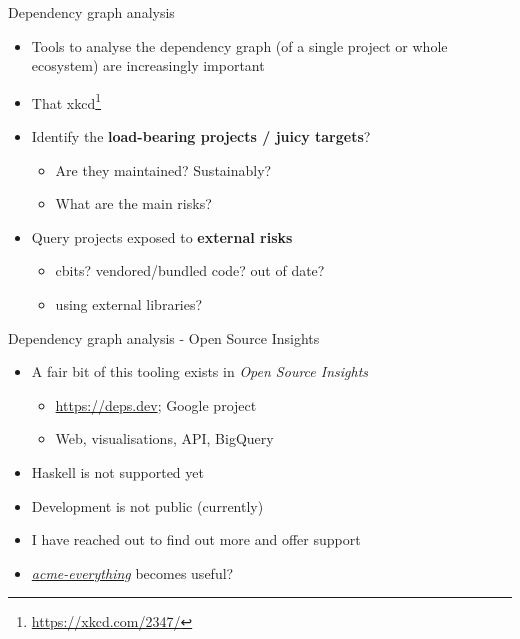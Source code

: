 \documentclass[ignorenonframetext,aspectratio=169,12pt]{beamer}
\begin{document}
\begin{frame}{Dependency graph analysis}
  \begin{itemize}
    \item Tools to analyse the dependency graph (of a single project
      or whole ecosystem) are increasingly important
    \item That xkcd\footnote{\url{https://xkcd.com/2347/}}
    \item Identify the {\bf load-bearing projects / juicy targets}?
      \begin{itemize}
        \item Are they maintained?  Sustainably?
        \item What are the main risks?
      \end{itemize}
    \item Query projects exposed to {\bf external risks}
      \begin{itemize}
        \item cbits?  vendored/bundled code?  out of date?
        \item using external libraries?
      \end{itemize}
  \end{itemize}
\end{frame}

\begin{frame}{Dependency graph analysis - Open Source Insights}
  \begin{itemize}
    \item A fair bit of this tooling exists in
      {\em Open Source Insights}
      \begin{itemize}
        \item \url{https://deps.dev}; Google project
        \item Web, visualisations, API, BigQuery
      \end{itemize}
    \item Haskell is not supported yet
    \item Development is not public (currently)
    \item I have reached out to find out more and offer support
    \item \href{https://hackage.haskell.org/package/acme-everything}
      {\em acme-everything} becomes useful?
  \end{itemize}
\end{frame}
\end{document}
